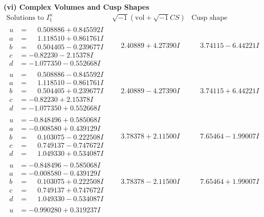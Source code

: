 \documentclass[1p]{elsarticle_modified}
\theoremstyle{definition}
\newcommand{\I}{\sqrt{-1}}
\begin{document}
\newpage\flushleft \textbf{(vi) Complex Volumes and Cusp Shapes}
$$\begin{array}{c|c|c}  
\text{Solutions to }I^u_{1}& \I (\text{vol} + \sqrt{-1}CS) & \text{Cusp shape}\\
 \hline 
\begin{aligned}
u &= \phantom{-}0.508886 + 0.845592 I \\
a &= \phantom{-}1.118510 + 0.861761 I \\
b &= \phantom{-}0.504405 - 0.239677 I \\
c &= -0.82230 - 2.15378 I \\
d &= -1.077350 - 0.552668 I\end{aligned}
 & \phantom{-}2.40889 + 4.27390 I & \phantom{-}3.74115 - 6.44221 I \\ \hline\begin{aligned}
u &= \phantom{-}0.508886 - 0.845592 I \\
a &= \phantom{-}1.118510 - 0.861761 I \\
b &= \phantom{-}0.504405 + 0.239677 I \\
c &= -0.82230 + 2.15378 I \\
d &= -1.077350 + 0.552668 I\end{aligned}
 & \phantom{-}2.40889 - 4.27390 I & \phantom{-}3.74115 + 6.44221 I \\ \hline\begin{aligned}
u &= -0.848496 + 0.585068 I \\
a &= -0.008580 + 0.439129 I \\
b &= \phantom{-}0.103075 - 0.222508 I \\
c &= \phantom{-}0.749137 - 0.747672 I \\
d &= \phantom{-}1.049330 + 0.534087 I\end{aligned}
 & \phantom{-}3.78378 + 2.11500 I & \phantom{-}7.65464 - 1.99007 I \\ \hline\begin{aligned}
u &= -0.848496 - 0.585068 I \\
a &= -0.008580 - 0.439129 I \\
b &= \phantom{-}0.103075 + 0.222508 I \\
c &= \phantom{-}0.749137 + 0.747672 I \\
d &= \phantom{-}1.049330 - 0.534087 I\end{aligned}
 & \phantom{-}3.78378 - 2.11500 I & \phantom{-}7.65464 + 1.99007 I \\ \hline\begin{aligned}
u &= -0.990280 + 0.319237 I \\

\end{aligned}
\end{array}$$
\end{document}
